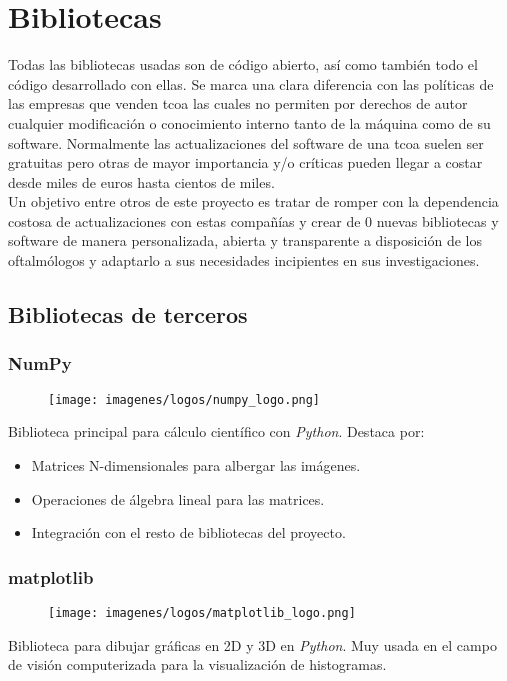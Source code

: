 \chapter{Bibliotecas}
Todas las bibliotecas usadas son de código abierto, así como también
todo el código desarrollado con ellas. Se marca una clara diferencia
con las políticas de las empresas que venden \gls{tcoa} las cuales no
permiten por derechos de autor cualquier modificación o conocimiento
interno tanto de la máquina como de su software. Normalmente las
actualizaciones del software de una \gls{tcoa} suelen ser gratuitas
pero otras de mayor importancia y/o críticas pueden llegar a costar
desde miles de euros hasta cientos de miles. \\
Un objetivo entre otros de este proyecto es tratar de romper con la
dependencia costosa de actualizaciones con estas compañías y crear de
0 nuevas bibliotecas y software de manera personalizada, abierta y
transparente a disposición de los oftalmólogos y adaptarlo a sus
necesidades incipientes en sus investigaciones.

\section{Bibliotecas de terceros}
\subsection{NumPy}
\begin{figure}[H]
  \texttt{[image: imagenes/logos/numpy\_logo.png]}
\end{figure}
Biblioteca principal para cálculo científico con
\emph{Python}. Destaca por:
\begin{itemize}
\item Matrices N-dimensionales para albergar las imágenes.
\item Operaciones de álgebra lineal para las matrices.
\item Integración con el resto de bibliotecas del proyecto.
\end{itemize}

\subsection{matplotlib}
\begin{figure}[H]
  \texttt{[image: imagenes/logos/matplotlib\_logo.png]}
\end{figure}
Biblioteca para dibujar gráficas en 2D y 3D en \emph{Python}. Muy
usada en el campo de visión computerizada para la visualización de
histogramas.


